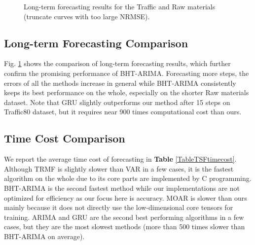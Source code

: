 \documentclass[letterpaper]{article} %
\numberwithin{theorem}{section}
\begin{document}
\begin{figure}[h]
	\centering
	\label{Multistep_Traffic80}
	 \label{Multistep_Raw}
	\caption{\label{raw2246_multistep} Long-term forecasting  results for the Traffic  and Raw materials  (truncate curves with too large NRMSE).}
\end{figure}




\subsection{Long-term Forecasting  Comparison}

Fig. \ref{raw2246_multistep}  shows the comparison of long-term forecasting results, which further confirm the promising performance of BHT-ARIMA. Forecasting  more  steps, the errors of all the  methods  increase in general while BHT-ARIMA consistently keeps its best performance on the whole, especially on the shorter Raw materials  dataset. Note that GRU slightly outperforms our method after  15 steps on Traffic80 dataset, but it requires near 900  times computational cost than ours.

\subsection{Time Cost Comparison}
We report the average time cost of forecasting in \textbf{Table}  \ref{TableTSFtimecost}.    Although TRMF is slightly slower   than VAR in a few cases,  it is the fastest algorithm on the whole due to its core parts are implemented by C programming. BHT-ARIMA  is the second fastest method while our implementations are not optimized for efficiency as our focus here is accuracy. MOAR is slower than ours mainly because it does not directly use the low-dimensional core tensors for training.  ARIMA and GRU are  the second best performing  algorithms in a few cases, but  they are the most slowest methods (more than  500 times slower than BHT-ARIMA on average).
\end{document}
